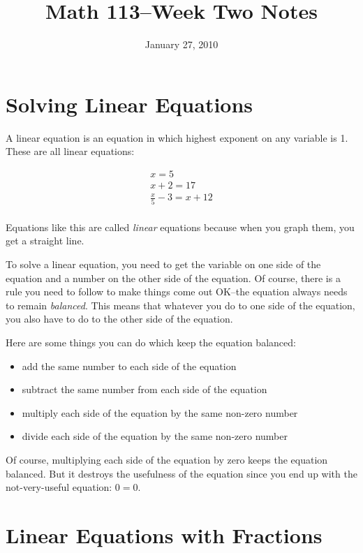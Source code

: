 \documentclass[fleqn]{article}
\title{Math 113--Week Two Notes}
\author{}
\date{January 27, 2010}
\begin{document}
\maketitle

\section{Solving Linear Equations}

A linear equation is an equation in which highest exponent on any variable is 1.  These are all linear equations:

\begin{eqnarray*}
  x = 5 \\
  x + 2 = 17 \\
  \frac{x}{5} - 3 = x + 12 \\
\end{eqnarray*}

Equations like this are called {\em linear} equations because when you graph them, you get a straight line.

To solve a linear equation, you need to get the variable on one side of the equation and a number on the other side of
the equation.  Of course, there is a rule you need to follow to make things come out OK--the equation always needs to remain
{\em balanced}.  This means that whatever you do to one side of the equation, you also have to do to the other side of
the equation.  

Here are some things you can do which keep the equation balanced:

\begin{itemize}
  \item add the same number to each side of the equation
  \item subtract the same number from each side of the equation
  \item multiply each side of the equation by the same non-zero number
  \item divide each side of the equation by the same non-zero number
\end{itemize}

Of course, multiplying each side of the equation by zero keeps the equation balanced.  But it destroys the usefulness of
the equation since you end up with the not-very-useful equation: \( 0 = 0 \).

\section{Linear Equations with Fractions}
\end{document}
